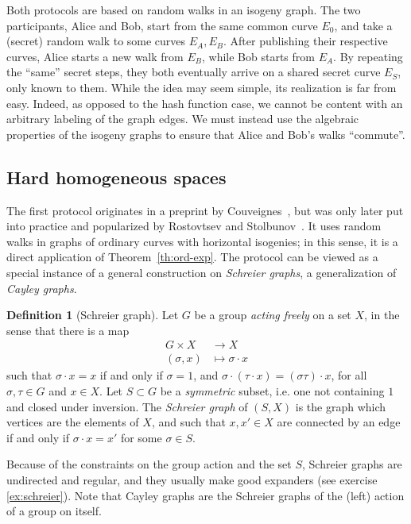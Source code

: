 \documentclass[10pt]{article}
\theoremstyle{plain}
\theoremstyle{definition}
\newtheorem{definition}[theorem]{Definition}
\begin{document}
Both protocols are based on random walks in an isogeny graph. %
The two participants, Alice and Bob, start from the same common curve
$E_0$, and take a (secret) random walk to some curves $E_A,E_B$. %
After publishing their respective curves, Alice starts a new walk from
$E_B$, while Bob starts from $E_A$. %
By repeating the ``same'' secret steps, they both eventually arrive on
a shared secret curve $E_S$, only known to them. %
While the idea may seem simple, its realization is far from easy. %
Indeed, as opposed to the hash function case, we cannot be content
with an arbitrary labeling of the graph edges. %
We must instead use the algebraic properties of the isogeny graphs to
ensure that Alice and Bob's walks ``commute''.

\subsection{Hard homogeneous spaces}

The first protocol originates in a preprint by Couveignes~\cite{Couv},
but was only later put into practice and popularized by Rostovtsev and
Stolbunov~\cite{R&S,Stol}. %
It uses random walks in graphs of ordinary curves with horizontal
isogenies; in this sense, it is a direct application of
Theorem~\ref{th:ord-exp}. %
The protocol can be viewed as a special instance of a general
construction on \emph{Schreier graphs}, a generalization of
\emph{Cayley graphs}.

\begin{definition}[Schreier graph]
  Let $G$ be a group \emph{acting freely} on a set $X$, in the sense
  that there is a map
  \begin{align*}
    G×X &\to X\\
    (σ,x) &\mapsto σ·x
  \end{align*}
  such that $σ·x=x$ if and only if $σ=1$, and $σ·(τ·x)=(στ)·x$, for
  all $σ,τ∈G$ and $x∈X$. %
  Let $S⊂G$ be a \emph{symmetric} subset, i.e. one not containing $1$
  and closed under inversion. %
  The \emph{Schreier graph} of $(S,X)$ is the graph which vertices are
  the elements of $X$, and such that $x,x'∈X$ are connected by an edge
  if and only if $σ·x=x'$ for some $σ∈S$.
\end{definition}

Because of the constraints on the group action and the set $S$,
Schreier graphs are undirected and regular, and they usually make good
expanders (see exercise \ref{ex:schreier}). %
Note that Cayley graphs are the Schreier graphs of the (left) action
of a group on itself.
\end{document}
